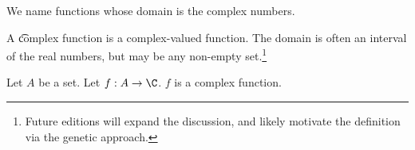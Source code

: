

We name functions whose domain is the complex numbers.


A \t{complex function} is a complex-valued function.
The domain is often an interval of the real numbers, but may be any non-empty set.\footnote{Future editions will expand the discussion, and likely motivate the definition via the genetic approach.}


Let $A$ be a set.
Let $f: A \to \C$.
$f$ is a complex function.

\blankpage
